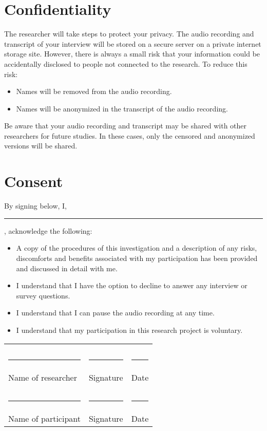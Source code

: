 \documentclass{article}
\begin{document}
    \section{Confidentiality}
      The researcher will take steps to protect your privacy.
      The audio recording and transcript of your interview will be stored on a secure server on a private internet storage site. However, there is always a small risk that your information could be accidentally disclosed to people not connected to the research.
      To reduce this risk:
      \begin{itemize}
        \item Names will be removed from the audio recording.
        \item Names will be anonymized in the transcript of the audio recording.
      \end{itemize}
      Be aware that your audio recording and transcript may be shared with other researchers for future studies.
      In these cases, only the censored and anonymized versions will be shared.

    \section{Consent}
      By signing below, I, \rule{3cm}{0.4pt}, acknowledge the following:
      \begin{itemize}
        \item A copy of the procedures of this investigation and a description of any risks, discomforts and benefits associated with my participation has been provided and discussed in detail with me.
        \item I understand that I have the option to decline to answer any interview or survey questions.
        \item I understand that I can pause the audio recording at any time.
        \item I understand that my participation in this research project is voluntary.
      \end{itemize}

      \noindent\begin{tabular}{l l l}
                                       &                              & \\
                                       &                              & \\
        \rule{0.35\textwidth}{0.4pt}   & \rule{0.35\textwidth}{0.4pt} & \rule{0.2\textwidth}{0.4pt} \\
        Name of researcher             & Signature                    & Date \\
                                       &                              & \\
                                       &                              & \\
        \rule{0.35\textwidth}{0.4pt}   & \rule{0.35\textwidth}{0.4pt} & \rule{0.2\textwidth}{0.4pt} \\
        Name of participant            & Signature                    & Date \\
      \end{tabular}
\end{document}
